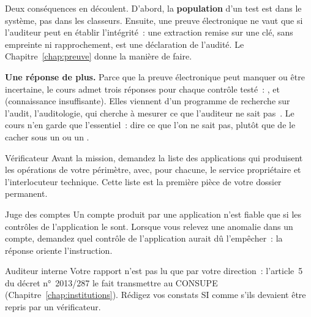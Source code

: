 Deux conséquences en découlent. D'abord, la \textbf{population} d'un test
est dans le système, pas dans les classeurs. Ensuite, une preuve
électronique ne vaut que si l'auditeur peut en établir l'intégrité~: une
extraction remise sur une clé, sans empreinte ni rapprochement, est une
déclaration de l'audité. Le Chapitre~\ref{chap:preuve} donne la manière de
faire.

\begin{boxinfo}
\textbf{Une réponse de plus.} Parce que la preuve électronique peut manquer
ou être incertaine, le cours admet trois réponses pour chaque contrôle
testé~: \OUI{}, \NON{} et \NEK{} (connaissance insuffisante). Elles
viennent d'un programme de recherche sur l'audit, l'auditologie, qui
cherche à mesurer ce que l'auditeur ne sait
pas~\cite{minka2026auditologie,minka2026nek}. Le cours n'en garde que
l'essentiel~: dire ce que l'on ne sait pas, plutôt que de le cacher sous un
\OUI{} ou un \NON{}.
\end{boxinfo}

\begin{boxmetier}{Vérificateur}
Avant la mission, demandez la liste des applications qui produisent les
opérations de votre périmètre, avec, pour chacune, le service
propriétaire et l'interlocuteur technique. Cette liste est la première
pièce de votre dossier permanent.
\end{boxmetier}

\begin{boxmetier}{Juge des comptes}
Un compte produit par une application n'est fiable que si les contrôles
de l'application le sont. Lorsque vous relevez une anomalie dans un
compte, demandez quel contrôle de l'application aurait dû l'empêcher~:
la réponse oriente l'instruction.
\end{boxmetier}

\begin{boxmetier}{Auditeur interne}
Votre rapport n'est pas lu que par votre direction~: l'article~5 du
décret n°~2013/287 le fait transmettre au CONSUPE
(Chapitre~\ref{chap:institutions}). Rédigez vos constats SI comme s'ils
devaient être repris par un vérificateur.
\end{boxmetier}

\separateur

